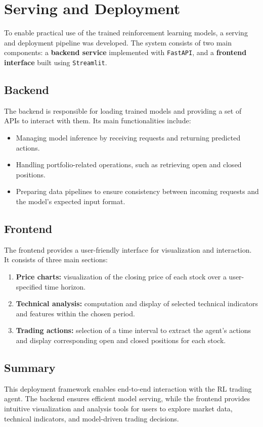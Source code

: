 \documentclass[12pt,a4paper]{report}
\begin{document}
\section{Serving and Deployment}
\label{sec:deployment}

To enable practical use of the trained reinforcement learning models, a serving and deployment pipeline was developed. The system consists of two main components: a \textbf{backend service} implemented with \texttt{FastAPI}, and a \textbf{frontend interface} built using \texttt{Streamlit}.

\subsection{Backend}
The backend is responsible for loading trained models and providing a set of APIs to interact with them. Its main functionalities include:
\begin{itemize}
    \item Managing model inference by receiving requests and returning predicted actions.
    \item Handling portfolio-related operations, such as retrieving open and closed positions.
    \item Preparing data pipelines to ensure consistency between incoming requests and the model’s expected input format.
\end{itemize}

\subsection{Frontend}
The frontend provides a user-friendly interface for visualization and interaction. It consists of three main sections:
\begin{enumerate}
    \item \textbf{Price charts:} visualization of the closing price of each stock over a user-specified time horizon.
    \item \textbf{Technical analysis:} computation and display of selected technical indicators and features within the chosen period.
    \item \textbf{Trading actions:} selection of a time interval to extract the agent’s actions and display corresponding open and closed positions for each stock.
\end{enumerate}

\subsection{Summary}
This deployment framework enables end-to-end interaction with the RL trading agent. The backend ensures efficient model serving, while the frontend provides intuitive visualization and analysis tools for users to explore market data, technical indicators, and model-driven trading decisions.
\end{document}
